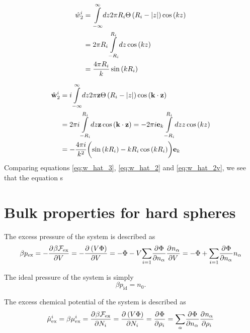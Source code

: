 \documentclass[12pt, letterpaper]{article}
\newcommand*{\pd}[3][]{\frac{\partial^{#1}#2}{\partial{#3}^{#1}}}%
\newcommand*{\abs}[1]{\lvert#1\rvert}
\newcommand*{\lb}{\ensuremath{\left(}}
\newcommand*{\rb}{\ensuremath{\right)}}
\newcommand{\excess}{\ensuremath{\text{ex}}\xspace}
\newcommand{\ideal}{\ensuremath{\text{id}}\xspace}
\begin{document}
\begin{align}
  \hat{w}_2^i &=  \overset{\infty}{\underset{-\infty}{\int}} dz 2 \pi R_i \Theta \lb R_i - \abs{z} \rb \cos \lb k z \rb \nonumber \\
              &=  2 \pi R_i \overset{R_i}{\underset{-R_i}{\int}} dz  \cos \lb k z \rb  \nonumber \\
              &=  \frac{4 \pi R_i}{k} \sin \lb k R_i \rb \label{eq:w_hat_2}
\end{align}

\begin{align}
  \hat{\mathbf{w}}_2^i &=  i \overset{\infty}{\underset{-\infty}{\int}} dz 2 \pi \mathbf{z}  \Theta \lb R_i - \abs{z} \rb \cos \lb \mathbf{k} \cdot \mathbf{z} \rb \nonumber \\
                       &=  2 \pi i  \overset{R_i}{\underset{-R_i}{\int}} dz \mathbf{z}  \cos \lb \mathbf{k} \cdot \mathbf{z} \rb =  - 2 \pi i \mathbf{e}_k  \overset{R_i}{\underset{-R_i}{\int}} dz z  \cos \lb k z \rb \nonumber \\
                       &=  -\frac{4 \pi i}{k^2} \biggl( \sin \lb k R_i \rb - k R_i \cos \lb k R_i \rb \biggr) \mathbf{e}_k \label{eq:w_hat_2v}
\end{align}
Comparing equations \eqref{eq:w_hat_3}, \eqref{eq:w_hat_2} and \eqref{eq:w_hat_2v}, we see that the equation s 


\section{Bulk properties for hard spheres}

The excess pressure of the system is described as
\begin{equation}
  \label{eq:pressure}
  \beta p_{\excess} = -\pd{\beta \mathcal{F_{\excess}}}{V} = -\pd{\lb V \Phi \rb}{V} = -\Phi - V\underset{i=1}{\sum} \pd{\Phi}{n_{\alpha}}\pd{n_{\alpha}}{V} = -\Phi + \underset{i=1}{\sum} \pd{\Phi}{n_{\alpha}}n_{\alpha}
\end{equation}

The ideal pressure of the system is simply
\begin{equation}
  \beta p_{\ideal} = n_{0}.
\end{equation}

The excess chemical potential of the system is described as
\begin{equation}
  \label{eq:chem_pot}
  \hat{\mu}^i_{\excess} = \beta \mu^i_{\excess} = \pd{\beta \mathcal{F_{\excess}}}{N_i} = \pd{\lb V \Phi \rb}{N_i} = \pd{\Phi}{\rho_{i}} = \underset{\alpha}{\sum} \pd{\Phi}{n_{\alpha}}\pd{n_{\alpha}}{\rho_{i}}
\end{equation}
\end{document}
